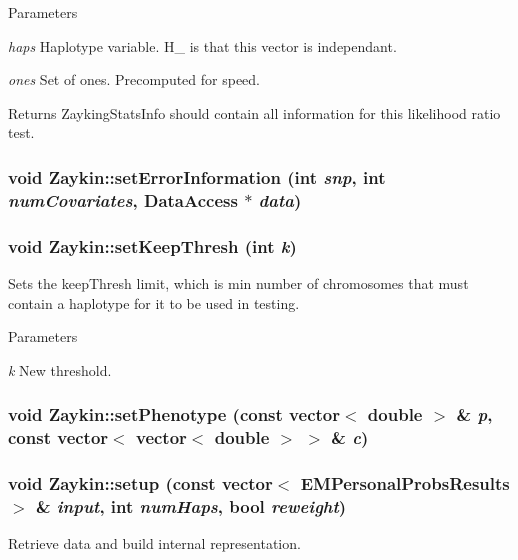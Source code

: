 \begin{DoxyParams}{Parameters}
\item[{\em haps}]Haplotype variable. H\_ is that this vector is independant. \item[{\em ones}]Set of ones. Precomputed for speed. \end{DoxyParams}
\begin{DoxyReturn}{Returns}
ZaykingStatsInfo should contain all information for this likelihood ratio test. 
\end{DoxyReturn}
\hypertarget{classZaykin_a4bc760635a1333aedbc911244d543dc6}{
\subsubsection[{setErrorInformation}]{\setlength{\rightskip}{0pt plus 5cm}void Zaykin::setErrorInformation (int {\em snp}, \/  int {\em numCovariates}, \/  {\bf DataAccess} $\ast$ {\em data})}}
\label{classZaykin_a4bc760635a1333aedbc911244d543dc6}
\hypertarget{classZaykin_a61bed374552233240a4cd9e6df612976}{
\subsubsection[{setKeepThresh}]{\setlength{\rightskip}{0pt plus 5cm}void Zaykin::setKeepThresh (int {\em k})}}
\label{classZaykin_a61bed374552233240a4cd9e6df612976}
Sets the keepThresh limit, which is min number of chromosomes that must contain a haplotype for it to be used in testing. 
\begin{DoxyParams}{Parameters}
\item[{\em k}]New threshold. \end{DoxyParams}
\hypertarget{classZaykin_afaa2e550bb5c905c428efc59dcef97f1}{
\subsubsection[{setPhenotype}]{\setlength{\rightskip}{0pt plus 5cm}void Zaykin::setPhenotype (const vector$<$ double $>$ \& {\em p}, \/  const vector$<$ vector$<$ double $>$ $>$ \& {\em c})}}
\label{classZaykin_afaa2e550bb5c905c428efc59dcef97f1}
\hypertarget{classZaykin_a8f1f7c88b1f685b6d76b221e5fabe1d5}{
\subsubsection[{setup}]{\setlength{\rightskip}{0pt plus 5cm}void Zaykin::setup (const vector$<$ {\bf EMPersonalProbsResults} $>$ \& {\em input}, \/  int {\em numHaps}, \/  bool {\em reweight})}}
\label{classZaykin_a8f1f7c88b1f685b6d76b221e5fabe1d5}
Retrieve data and build internal representation.

